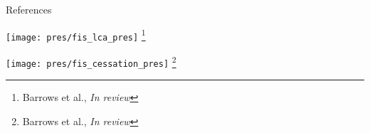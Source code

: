\documentclass[aspectratio=169]{beamer}
\newcommand\blfootnote[1]{%
	\begingroup
	\renewcommand\thefootnote{}\footnote{#1}%
	\addtocounter{footnote}{-1}%
	\endgroup
}
\newcommand{\reviewcite}{\blfootnote{\tiny Barrows et al., \textit{In review}}}
\begin{document}
\begin{frame}[allowframebreaks]{References}

		\tiny
		\printbibliography

\end{frame}

\begin{frame}{}
	
		\texttt{[image: pres/fis\_lca\_pres]}
	\reviewcite
\end{frame}

\begin{frame}{}
	\texttt{[image: pres/fis\_cessation\_pres]}
	\reviewcite
\end{frame}

	
	
\end{document}
